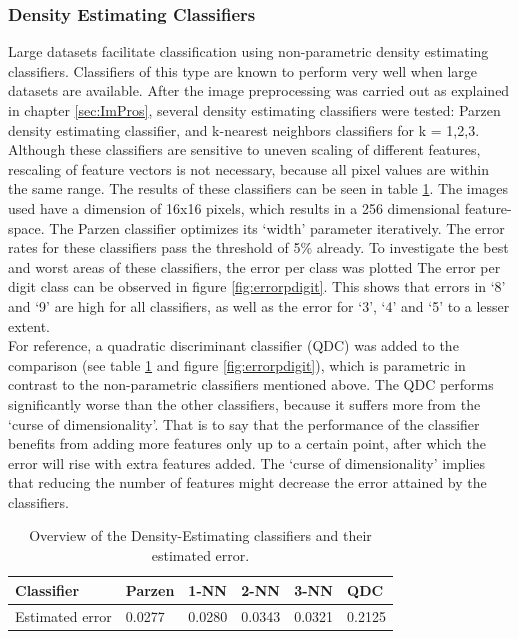 \subsubsection*{Density Estimating Classifiers}
Large datasets facilitate classification using non-parametric density estimating classifiers. Classifiers of this type are known to perform very well when large datasets are available. After the image preprocessing was carried out as explained in chapter \ref{sec:ImPros}, several density estimating classifiers were tested: Parzen density estimating classifier, and k-nearest neighbors classifiers for k = 1,2,3. Although these classifiers are sensitive to uneven scaling of different features, rescaling of feature vectors is not necessary, because all pixel values are within the same range. The results of these classifiers can be seen in table \ref{tab:density}. The images used have a dimension of 16x16 pixels, which results in a 256 dimensional feature-space. The Parzen classifier optimizes its ‘width’ parameter iteratively. The error rates for these classifiers pass the threshold of 5\% already. To investigate the best and worst areas of these classifiers, the error per class was plotted The error per digit class can be observed in figure \ref{fig:errorpdigit}. This shows that errors in ‘8’ and ‘9’ are high for all classifiers, as well as the error for ‘3’, ‘4’ and ‘5’ to a lesser extent. \\
For reference, a quadratic discriminant classifier (QDC) was added to the comparison (see table \ref{tab:density} and figure \ref{fig:errorpdigit}), which is parametric in contrast to the non-parametric classifiers mentioned above. The QDC performs significantly worse than the other classifiers, because it suffers more from the ‘curse of dimensionality’. That is to say that the performance of the classifier benefits from adding more features only up to a certain point, after which the error will rise with extra features added. The ‘curse of dimensionality’ implies that reducing the number of features might decrease the error attained by the classifiers.
\begin{table}[H]
	\centering
	\caption{Overview of the Density-Estimating classifiers and their estimated error.}
	\label{tab:density}
	\begin{tabular}{l|lllll}
		Classifier      & Parzen & 1-NN   & 2-NN   & 3-NN   & QDC    \\ \hline
		Estimated error & 0.0277 & 0.0280 & 0.0343 & 0.0321 & 0.2125
	\end{tabular}
\end{table}
